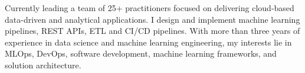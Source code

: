 

\begin{cvparagraph}

Currently leading a team of 25+ practitioners focused on delivering cloud-based data-driven and analytical applications. I design and implement machine learning pipelines, REST APIs, ETL and CI/CD pipelines. With more than three years of experience in data science and machine learning engineering, my interests lie in MLOps, DevOps, software development, machine learning frameworks, and solution architecture.
\end{cvparagraph}
